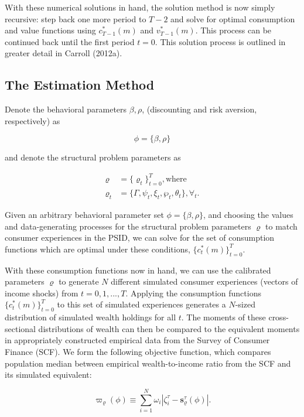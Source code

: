 \documentclass[]{article}
\begin{document}
With these numerical solutions in hand, the solution method is now
simply recursive: step back one more period to $T-2$ and solve for
optimal consumption and value functions using $c_{T-1}^{*}(m)$ and
$v_{T-1}^{*}(m)$. This process can be continued back until the first
period $t=0$. This solution process is outlined in greater detail in
Carroll (2012a).

\subsection{The Estimation Method}\label{the-estimation-method}

Denote the behavioral parameters $\beta, \rho$, (discounting and risk
aversion, respectively) as

\[\phi = \{\beta, \rho\}\]

and denote the structural problem parameters as

\[
\begin{aligned}
\varrho & = \{ \varrho_{t} \}_{t=0} ^{T}, \mathrm{ where } \\
\varrho_{t} & = \{ \Gamma, \psi_{t}, \xi_{t}, \wp_t, \theta_t \}, \forall_t .
\end{aligned}
\]

Given an arbitrary behavioral parameter set $\phi = \{\beta, \rho\}$,
and choosing the values and data-generating processes for the structural
problem parameters $\varrho$ to match consumer experiences in the PSID,
we can solve for the set of consumption functions which are optimal
under these conditions, $\{ c_{t}^{*}(m) \}_{t=0}^{T}.$

With these consumption functions now in hand, we can use the calibrated
parameters $\varrho$ to generate $N$ different simulated consumer
experiences (vectors of income shocks) from $t=0,1,...,T$. Applying the
consumption functions $\{ c_{t}^{*}(m)\}_{t=0}^{T}$ to this set of
simulated experiences generates a $N$-sized distribution of simulated
wealth holdings for all $t$. The moments of these cross-sectional
distributions of wealth can then be compared to the equivalent moments
in appropriately constructed empirical data from the Survey of Consumer
Finance (SCF). We form the following objective function, which compares
population median between empirical wealth-to-income ratio from the SCF
and its simulated equivalent:

\[\varpi_{\varrho}(\phi) \equiv \sum_{i=1}^{N} \omega_{i}|\zeta_{i}^{\tau}-\mathbf{s}^{\tau}_{\varrho}(\phi)|.\]
\end{document}

